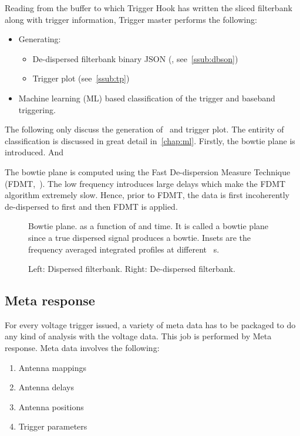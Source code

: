 \par Reading from the buffer to which Trigger Hook has written the sliced filterbank along with trigger information, Trigger master performs the following:
\begin{itemize}
	\item Generating: 
		\begin{itemize}
			\item De-dispersed filterbank binary JSON (\dbson, see~\autoref{ssub:dbson})
			\item Trigger plot (see~\autoref{ssub:tp})
		\end{itemize}
	\item Machine learning (ML) based classification of the trigger and baseband triggering.
\end{itemize}

\par The following only discuss the generation of \dbson~and trigger plot. 
The entirity of classification is discussed in great detail in~\autoref{chap:ml}.
Firstly, the bowtie plane is introduced. And

\par The bowtie plane is computed using the Fast De-dispersion Measure Technique (FDMT,~\cite{fdmt}).
The low frequency introduces large delays which make the FDMT algorithm extremely slow. 
Hence, prior to FDMT, the data is first incoherently de-dispersed to first \dm and then FDMT is applied.

\begin{figure}
	\label{fig:bt}
	\caption{Bowtie plane. \sn as a function of \dm and time. 
	It is called a bowtie plane since a true dispersed signal produces a bowtie.
	Insets are the frequency averaged integrated profiles at different \dm~s.
}
\end{figure}

\begin{figure}
	\label{fig:dd}
	\caption{Left: Dispersed filterbank. Right: De-dispersed filterbank.}
\end{figure}

\subsection {Meta response}
\par For every voltage trigger issued, a variety of meta data has to be packaged to do any kind of analysis with the voltage data. 
This job is performed by Meta response. Meta data involves the following:
\begin{enumerate}
\item Antenna mappings
\item Antenna delays
\item Antenna positions
\item Trigger parameters
\end{enumerate}

